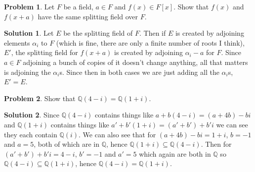 \documentclass[10pt]{article}
\theoremstyle{definition}
\newtheorem{problem}{Problem}
\newtheorem{soln}{Solution}
\begin{document}
\begin{problem}
Let $F$ be a field, $a\in F$ and $f(x) \in F[x]$. Show that $f(x)$ and $f(x+a)$ have the
same splitting field over $F$.
\end{problem}
\begin{soln}
  Let $E$ be the splitting field of $F$. Then if $E$ is created by adjoining elements
  $\alpha_i$ to $F$ (which is fine, there are only a finite number of roots I think),
  $E'$, the splitting field for $f(x+a)$ is created by adjoining $\alpha_i-a$ for $F$.
  Since $a \in F$ adjoining a bunch of copies of it doesn't change anything, all that matters is adjoining the $\alpha_i$s.
  Since then in both cases we are just adding all the $\alpha_i$s, $E'=E$.
\end{soln}

\begin{problem}
Show that $\mathbb{Q}(4-i)=\mathbb{Q}(1+i)$.
\end{problem}
\begin{soln}
  Since $\mathbb{Q}(4-i)$ contains things like $a+b(4-i)=(a+4b)-bi$ and $\mathbb{Q}(1+i)$ contains things like
  $a'+b'(1+i)=(a'+b')+b'i$ we can see they each contain $\mathbb{Q}(i)$. We can also see that for
  $(a+4b)-bi=1+i$, $b=-1$ and $a=5$, both of which are in $\mathbb{Q}$, hence $\mathbb{Q}(1+i)\subseteq \mathbb{Q}(4-i)$.
  Then for $(a'+b')+b'i=4-i$, $b'=-1$ and $a'=5$ which again are both in $\mathbb{Q}$ so $\mathbb{Q}(4-i)\subseteq \mathbb{Q}(1+i)$, hence
  $\mathbb{Q}(4-i)=\mathbb{Q}(1+i)$.
\end{soln}
\end{document}
